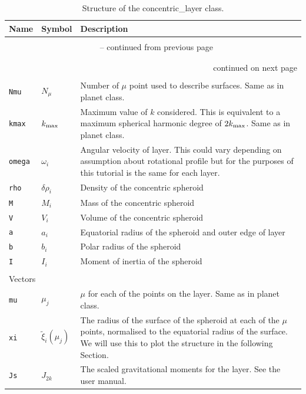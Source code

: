 \documentclass[11pt, oneside]{article}   	%
\begin{document}
\begin{longtable}{l l p{10cm}}
\caption{Structure of the concentric\_layer class.}
\label{tab:concentric_layer_class} \\

Name & Symbol & Description \\ \hline \hline
\multicolumn{3}{l}{} \\
\endfirsthead

\multicolumn{3}{c}{{\tablename\ \thetable{} -- continued from previous page}} \\
\multicolumn{3}{l}{} \\
\endhead

\multicolumn{3}{l}{} \\
\multicolumn{3}{r}{{continued on next page}} \\
\endfoot

\endlastfoot

\multicolumn{3}{l}{Variables} \\
\hline
\texttt{Nmu} & $N_{\mu}$ & Number of $\mu$ point used to describe surfaces. Same as in planet class. \\
\texttt{kmax} & $k_{\rm max}$ & Maximum value of $k$ considered. This is equivalent to a maximum spherical harmonic degree of $2k_{\rm max}$. Same as in planet class. \\
\texttt{omega} & $\omega_i$ & Angular velocity of layer. This could vary depending on assumption about rotational profile but for the purposes of this tutorial is the same for each layer. \\
\texttt{rho} & $\delta \rho_i$ & Density of the concentric spheroid \\
\texttt{M} & $M_i$ & Mass of the concentric spheroid \\
\texttt{V} & $V_i$ & Volume of the concentric spheroid \\
\texttt{a} & $a_i$ & Equatorial radius of the spheroid and outer edge of layer \\
\texttt{b} & $b_i$ & Polar radius of the spheroid \\
\texttt{I} & $I_i$ & Moment of inertia of the spheroid \\


\multicolumn{3}{l}{} \\
\multicolumn{3}{l}{Vectors} \\
\hline
\texttt{mu} & $\mu_j$ & $\mu$ for each of the points on the layer. Same as in planet class. \\
\texttt{xi} & $\tilde{\xi}_i (\mu_j)$ & The radius of the surface of the spheroid at each of the $\mu$ points, normalised to the equatorial radius of the surface. We will use this to plot the structure in the following Section. \\
\texttt{Js} & $J_{2k}$ & The scaled gravitational moments for the layer. See the user manual. \\

\end{longtable}
\vspace{0.5 cm}
\end{document}
